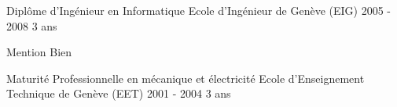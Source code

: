 
\begin{cventries}

  \cventry
    {Diplôme d'Ingénieur en Informatique}
    {Ecole d'Ingénieur de Genève (EIG)}
    {2005 - 2008}
    {3 ans}
    {
      \begin{cvitems}
        \item {Mention Bien}
      \end{cvitems}
    }

  \cventry
    {Maturité Professionnelle en mécanique et électricité}
    {Ecole d'Enseignement Technique de Genève (EET)}
    {2001 - 2004}
    {3 ans}
    {}

\end{cventries}
